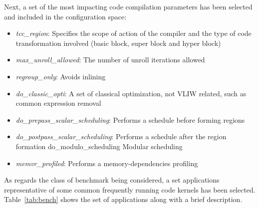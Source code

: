 Next, a set of the most impacting code compilation parameters has been
selected and included in the configuration space:
\begin{itemize}
\item \emph{tcc\_region}: Specifies the scope of action of the compiler and the type
of code transformation involved (basic block, super block and hyper
block) 
\item \emph {max\_unroll\_allowed}: The number of unroll iterations allowed
\item \emph{regroup\_only}: Avoids inlining 
\item \emph{do\_classic\_opti}: A set of classical optimization, not VLIW related,
such as common expression removal 
\item \emph{do\_prepass\_scalar\_scheduling}: Performs a schedule before
forming regions 
\item \emph{do\_postpass\_scalar\_scheduling}: Performs a schedule after the region formation 
do\_modulo\_scheduling  Modular scheduling 
\item \emph{memvr\_profiled}: Performs a memory-dependencies profiling 
\end{itemize}

As regards the class of benchmark being considered, a set applications representative of some common
frequently running code kernels has been selected. Table~\ref{tab:bench} shows the set of applications
along with a brief description.

\begin{table}
\end{table}
